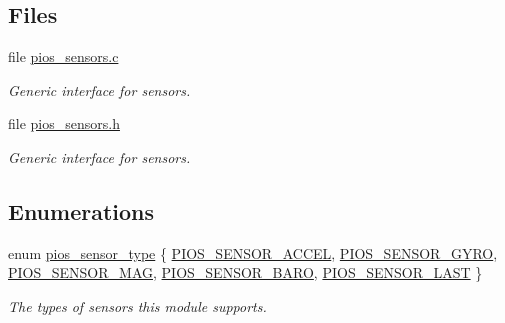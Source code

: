 \subsection*{\-Files}
\begin{DoxyCompactItemize}
\item 
file \hyperlink{pios__sensors_8c}{pios\-\_\-sensors.\-c}
\begin{DoxyCompactList}\small\item\em \-Generic interface for sensors. \end{DoxyCompactList}\item 
file \hyperlink{pios__sensors_8h}{pios\-\_\-sensors.\-h}
\begin{DoxyCompactList}\small\item\em \-Generic interface for sensors. \end{DoxyCompactList}\end{DoxyCompactItemize}
\subsection*{\-Enumerations}
\begin{DoxyCompactItemize}
\item 
enum \hyperlink{group___p_i_o_s___s_e_n_s_o_r_s_gadad1b67d985a6c9c150a70d23aac96a0}{pios\-\_\-sensor\-\_\-type} \{ \*
\hyperlink{group___p_i_o_s___s_e_n_s_o_r_s_ggadad1b67d985a6c9c150a70d23aac96a0a0b386dcd14ce22a4ec0f296727338876}{\-P\-I\-O\-S\-\_\-\-S\-E\-N\-S\-O\-R\-\_\-\-A\-C\-C\-E\-L}, 
\hyperlink{group___p_i_o_s___s_e_n_s_o_r_s_ggadad1b67d985a6c9c150a70d23aac96a0aa15cffcc905e0229f765c0653a43d6fe}{\-P\-I\-O\-S\-\_\-\-S\-E\-N\-S\-O\-R\-\_\-\-G\-Y\-R\-O}, 
\hyperlink{group___p_i_o_s___s_e_n_s_o_r_s_ggadad1b67d985a6c9c150a70d23aac96a0a5a4ddf59e023cf155e5af7f8304e644f}{\-P\-I\-O\-S\-\_\-\-S\-E\-N\-S\-O\-R\-\_\-\-M\-A\-G}, 
\hyperlink{group___p_i_o_s___s_e_n_s_o_r_s_ggadad1b67d985a6c9c150a70d23aac96a0aa17c455b7f9000f88b8d60d6c3ab1db0}{\-P\-I\-O\-S\-\_\-\-S\-E\-N\-S\-O\-R\-\_\-\-B\-A\-R\-O}, 
\*
\hyperlink{group___p_i_o_s___s_e_n_s_o_r_s_ggadad1b67d985a6c9c150a70d23aac96a0a022b8f5e76ed6659cdf85b004be20170}{\-P\-I\-O\-S\-\_\-\-S\-E\-N\-S\-O\-R\-\_\-\-L\-A\-S\-T}
 \}
\begin{DoxyCompactList}\small\item\em \-The types of sensors this module supports. \end{DoxyCompactList}\end{DoxyCompactItemize}
